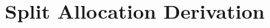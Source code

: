 







\chapter{Split Allocation Derivation}
\makeatletter{}\makeatother
\label{appen:split_allocation}

